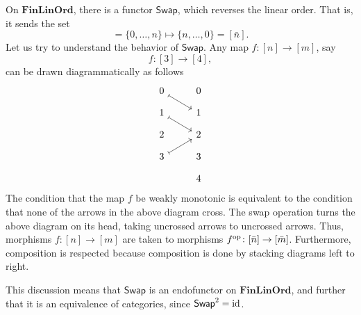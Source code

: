 \documentclass[main.tex]{subfiles}
\begin{document}
On $\mathbf{FinLinOrd}$, there is a functor $\mathsf{Swap}$, which reverses the linear order. That is, it sends the set
\begin{equation*}
  [n] = \{0, \ldots, n\} \mapsto \{n, \ldots, 0\} = [\bar{n}].
\end{equation*}
Let us try to understand the behavior of $\mathsf{Swap}$. Any map $f\colon [n] \to [m]$, say
\begin{equation*}
  f\colon [3] \to [4],
\end{equation*}
can be drawn diagrammatically as follows
\begin{equation*}
  \begin{tikzcd}[row sep=small]
    0
    \arrow[dr, mapsto]
    & 0
    \\
    1
    \arrow[dr, mapsto]
    & 1
    \\
    2
    & 2
    \\
    3
    \arrow[ur, mapsto]
    & 3
    \\
    & 4
  \end{tikzcd}
\end{equation*}
The condition that the map $f$ be weakly monotonic is equivalent to the condition that none of the arrows in the above diagram cross. The swap operation turns the above diagram on its head, taking uncrossed arrows to uncrossed arrows. Thus, morphisms $f\colon [n] \to [m]$ are taken to morphisms $f^{\mathrm{op}}\colon [\bar{n}] \to [\bar{m}]$. Furthermore, composition is respected because composition is done by stacking diagrams left to right.

This discussion means that $\mathsf{Swap}$ is an endofunctor on $\mathbf{FinLinOrd}$, and further that it is an equivalence of categories, since $\mathsf{Swap}^{2} = \mathrm{id}$.
\end{document}
